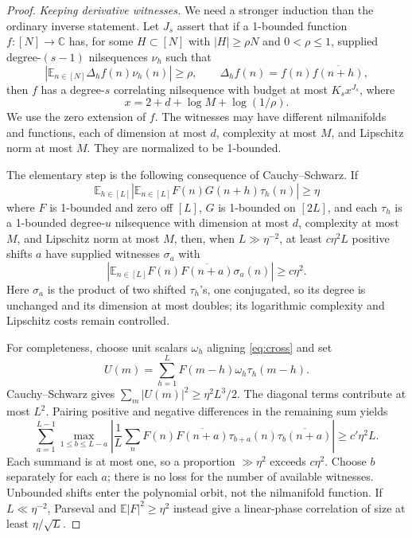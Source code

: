 \documentclass[11pt,a4paper]{article}
\theoremstyle{definition}
\newcommand{\E}{\mathbb E}
\begin{document}
\begin{proof}
\textit{Keeping derivative witnesses.}
We need a stronger induction than the ordinary inverse
statement. Let \(J_s\) assert that if a 1-bounded function
\(f:[N]\to\mathbb C\) has, for some \(H\subset[N]\)
with \(|H|\ge\rho N\) and \(0<\rho\le1\), supplied
degree-\((s-1)\) nilsequences
\(\nu_h\) such that
\[
 \left|\E_{n\in[N]}\Delta_h f(n)\nu_h(n)\right|\ge\rho,
 \qquad \Delta_hf(n)=f(n)\overline{f(n+h)},
\]
then \(f\) has a degree-\(s\) correlating nilsequence with
budget at most \(K_sx^{J_s}\), where
\[
 x=2+d+\log M+\log(1/\rho).
\]
We use the zero extension of \(f\). The witnesses may
have different nilmanifolds and functions, each of dimension
at most \(d\), complexity at most \(M\), and Lipschitz norm
at most \(M\). They are normalized to be 1-bounded.

The elementary step is the following consequence of
Cauchy--Schwarz. If
\begin{equation}\label{eq:cross}
 \E_{h\in[L]}
 \left|\E_{n\in[L]}F(n)G(n+h)\tau_h(n)\right|\ge\eta
\end{equation}
where \(F\) is 1-bounded and zero off \([L]\), \(G\) is
1-bounded on \([2L]\), and each \(\tau_h\) is a 1-bounded
degree-\(u\) nilsequence with dimension at most \(d\),
complexity at most \(M\), and Lipschitz norm at most \(M\),
then, when \(L\gg\eta^{-2}\), at least
\(c\eta^2L\) positive shifts \(a\) have supplied witnesses
\(\sigma_a\) with
\begin{equation}\label{eq:derivative}
 \left|\E_{n\in[L]}
       F(n)\overline{F(n+a)}\sigma_a(n)\right|\ge c\eta^2.
\end{equation}
Here \(\sigma_a\) is the product of two shifted
\(\tau_h\)'s, one conjugated, so its degree is unchanged
and its dimension at most doubles; its logarithmic
complexity and Lipschitz costs remain controlled.

For completeness, choose unit scalars \(\omega_h\)
aligning \eqref{eq:cross} and set
\[
 U(m)=\sum_{h=1}^L F(m-h)\omega_h\tau_h(m-h).
\]
Cauchy--Schwarz gives
\(\sum_m|U(m)|^2\ge\eta^2L^3/2\).
The diagonal terms contribute at most \(L^2\).
Pairing positive and negative differences in the
remaining sum yields
\[
 \sum_{a=1}^{L-1}\max_{1\le b\le L-a}
 \left|\frac1L\sum_n
 F(n)\overline{F(n+a)}
 \tau_{b+a}(n)\overline{\tau_b(n+a)}\right|
 \ge c'\eta^2L.
\]
Each summand is at most one, so a proportion
\(\gg\eta^2\) exceeds \(c\eta^2\). Choose \(b\)
separately for each \(a\); there is no loss for the
number of available witnesses. Unbounded shifts enter
the polynomial orbit, not the nilmanifold function.
If \(L\ll\eta^{-2}\), Parseval and
\(\E|F|^2\ge\eta^2\) instead give a linear-phase
correlation of size at least \(\eta/\sqrt L\).


\end{proof}
\end{document}
